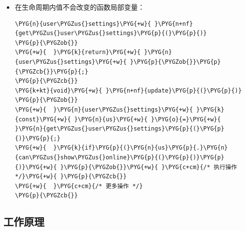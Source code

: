 \begin{itemize}
\begin{codeblockbg}
\begin{Verbatim}[commandchars=\\\{\},breaklines=true,breakanywhere=true,fontsize=\codefont,xleftmargin=17bp]
\PYG{k}{class}\PYG{+w}{ }\PYG{n+nc}{user\PYGZus{}settings}
\PYG{p}{\PYGZob{}}
\PYG{+w}{  }\PYG{k+kt}{bool}\PYG{+w}{ }\PYG{n}{show\PYGZus{}online}\PYG{p}{;}
\PYG{+w}{  }\PYG{k}{public}\PYG{o}{:}
\PYG{+w}{  }\PYG{k+kt}{bool}\PYG{+w}{ }\PYG{n}{can\PYGZus{}show\PYGZus{}online}\PYG{p}{(}\PYG{p}{)}\PYG{+w}{ }\PYG{k}{const}\PYG{+w}{ }\PYG{p}{\PYGZob{}}\PYG{k}{return}\PYG{+w}{ }\PYG{n}{show\PYGZus{}online}\PYG{p}{;}\PYG{p}{\PYGZcb{}}
\PYG{+w}{  }\PYG{c+cm}{/* 其他成员 */}
\PYG{p}{\PYGZcb{}}\PYG{p}{;}
\end{Verbatim}
\end{codeblockbg}



\item 在生命周期内值不会改变的函数局部变量：



\begin{codeblockbg}
\begin{Verbatim}[commandchars=\\\{\},breaklines=true,breakanywhere=true,fontsize=\codefont,xleftmargin=17bp]
\PYG{n}{user\PYGZus{}settings}\PYG{+w}{ }\PYG{n+nf}{get\PYGZus{}user\PYGZus{}settings}\PYG{p}{(}\PYG{p}{)}
\PYG{p}{\PYGZob{}}
\PYG{+w}{  }\PYG{k}{return}\PYG{+w}{ }\PYG{n}{user\PYGZus{}settings}\PYG{+w}{ }\PYG{p}{\PYGZob{}}\PYG{p}{\PYGZcb{}}\PYG{p}{;}
\PYG{p}{\PYGZcb{}}
\PYG{k+kt}{void}\PYG{+w}{ }\PYG{n+nf}{update}\PYG{p}{(}\PYG{p}{)}
\PYG{p}{\PYGZob{}}
\PYG{+w}{  }\PYG{n}{user\PYGZus{}settings}\PYG{+w}{ }\PYG{k}{const}\PYG{+w}{ }\PYG{n}{us}\PYG{+w}{ }\PYG{o}{=}\PYG{+w}{ }\PYG{n}{get\PYGZus{}user\PYGZus{}settings}\PYG{p}{(}\PYG{p}{)}\PYG{p}{;}
\PYG{+w}{  }\PYG{k}{if}\PYG{p}{(}\PYG{n}{us}\PYG{p}{.}\PYG{n}{can\PYGZus{}show\PYGZus{}online}\PYG{p}{(}\PYG{p}{)}\PYG{p}{)}\PYG{+w}{ }\PYG{p}{\PYGZob{}}\PYG{+w}{ }\PYG{c+cm}{/* 执行操作 */}\PYG{+w}{ }\PYG{p}{\PYGZcb{}}
\PYG{+w}{  }\PYG{c+cm}{/* 更多操作 */}
\PYG{p}{\PYGZcb{}}
\end{Verbatim}
\end{codeblockbg}

\end{itemize}



\subsection{工作原理}


